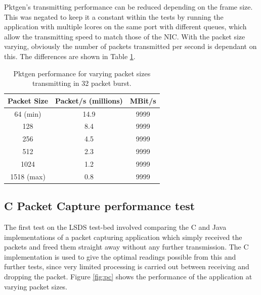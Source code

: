 \documentclass[final_report.tex]{subfiles}
\begin{document}
Pktgen's transmitting performance can be reduced depending on the frame size. This was negated to keep it a constant within the tests by running the application with multiple lcores on the same port with different queues, which allow the transmitting speed to match those of the NIC. With the packet size varying, obviously the number of packets transmitted per second is dependant on this. The differences are shown in Table \ref{tab:pktgen}.

\begin{table}[H]
	\centering
	\begin{tabular} { | c | c | c | }
		\hline
		\textbf{Packet Size} & \textbf{Packet/s (millions)} & \textbf{MBit/s} \\
		\hline
		64 (min) & 14.9 & 9999 \\
		\hline
		128 & 8.4 & 9999 \\
		\hline
		256 & 4.5 & 9999 \\
		\hline
		512 & 2.3 & 9999 \\
		\hline
		1024 & 1.2 & 9999 \\
		\hline
		1518 (max) & 0.8 & 9999 \\
		\hline
	\end{tabular}
	\caption{Pktgen performance for varying packet sizes transmitting in 32 packet burst.}
	\label{tab:pktgen}
\end{table}


\subsection{C Packet Capture performance test}
The first test on the LSDS test-bed involved comparing the C and Java implementations of a packet capturing application which simply received the packets and freed them straight away without any further transmission. The C implementation is used to give the optimal readings possible from this and further tests, since very limited processing is carried out between receiving and dropping the packet. Figure \ref{fig:pc} shows the performance of the application at varying packet sizes.
\end{document}
